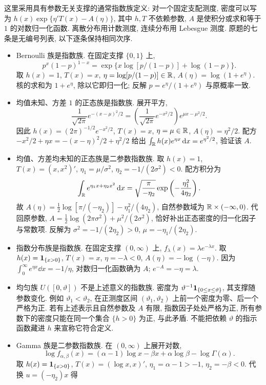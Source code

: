 \begin{solution}
这里采用具有参数无关支撑的通常指数族定义: 对一个固定支配测度, 密度可以写为 $h(x)\exp\{\eta' T(x)-A(\eta)\}$, 其中 $h,T$ 不依赖参数, $A$ 是使积分或求和等于 $1$ 的对数归一化函数. 离散分布用计数测度, 连续分布用 Lebesgue 测度. 原题的七条是无编号列表, 以下逐条保持相同次序.
\begin{itemize}
\item Bernoulli 族是指数族. 在固定支撑 $\{0,1\}$ 上,
\[
p^x(1-p)^{1-x}=\exp\{x\log[p/(1-p)]+\log(1-p)\}.
\]
取 $h(x)=1$, $T(x)=x$, $\eta=\log[p/(1-p)]\in\mathbb R$, $A(\eta)=\log(1+e^\eta)$. 核的求和为 $1+e^\eta$, 除以它即归一化; 反解 $p=e^\eta/(1+e^\eta)$ 与原概率一致.
\item 均值未知、方差 $1$ 的正态族是指数族. 展开平方,
\[
\frac1{\sqrt{2\pi}}e^{-(x-\mu)^2/2}
=\left(\frac1{\sqrt{2\pi}}e^{-x^2/2}\right)e^{\mu x-\mu^2/2}.
\]
因此 $h(x)=(2\pi)^{-1/2}e^{-x^2/2}$, $T(x)=x$, $\eta=\mu\in\mathbb R$, $A(\eta)=\eta^2/2$. 配方 $-x^2/2+\eta x=-(x-\eta)^2/2+\eta^2/2$ 给出 $\int_\mathbb R h(x)e^{\eta x}\,\mathrm d x=e^{\eta^2/2}$, 验证该 $A$.
\item 均值、方差均未知的正态族是二参数指数族. 取 $h(x)=1$, $T(x)=(x,x^2)'$, $\eta_1=\mu/\sigma^2$, $\eta_2=-1/(2\sigma^2)<0$. 配方积分为
\[
\int_\mathbb R e^{\eta_1x+\eta_2x^2}\,\mathrm d x
=\sqrt{\frac\pi{-\eta_2}}\exp\left(-\frac{\eta_1^2}{4\eta_2}\right).
\]
故 $A(\eta)=\frac12\log[\pi/(-\eta_2)]-\eta_1^2/(4\eta_2)$, 自然参数域为 $\mathbb R\times(-\infty,0)$. 代回原参数, $A=\frac12\log(2\pi\sigma^2)+\mu^2/(2\sigma^2)$, 恰好补出正态密度的归一化因子与常数项. 反解为 $\sigma^2=-1/(2\eta_2)>0$, $\mu=-\eta_1/(2\eta_2)$.
\item 指数分布族是指数族. 在固定支撑 $(0,\infty)$ 上, $f_\lambda(x)=\lambda e^{-\lambda x}$. 取 $h(x)=\mathbf 1_{\{x>0\}}$, $T(x)=x$, $\eta=-\lambda<0$, $A(\eta)=-\log(-\eta)$. 因为 $\int_0^\infty e^{\eta x}\dd x=-1/\eta$, 对数归一化函数确为 $A$; $e^{-A}=-\eta=\lambda$.
\item 均匀族 $U([0,\vartheta])$ 不是上述意义的指数族. 密度为 $\vartheta^{-1}\mathbf 1_{\{0\le x\le\vartheta\}}$, 其支撑随参数变化. 例如 $\vartheta_1<\vartheta_2$, 在正测度区间 $(\vartheta_1,\vartheta_2)$ 上前一个密度为零、后一个严格为正. 若有上述表示且自然参数及 $A$ 有限, 指数因子处处严格为正, 所有参数下的密度只能在同一个集合 $\{h>0\}$ 为正, 与此矛盾. 不能把依赖 $\vartheta$ 的指示函数藏进 $h$ 来宣称它符合定义.
\item Gamma 族是二参数指数族. 在 $(0,\infty)$ 上展开对数,
\[
\log f_{\alpha,\beta}(x)
=(\alpha-1)\log x-\beta x+\alpha\log\beta-\log\Gamma(\alpha).
\]
取 $h(x)=\mathbf 1_{\{x>0\}}$, $T(x)=(\log x,x)'$, $\eta_1=\alpha-1>-1$, $\eta_2=-\beta<0$. 代换 $u=(-\eta_2)x$ 得

\end{itemize}
\end{solution}
